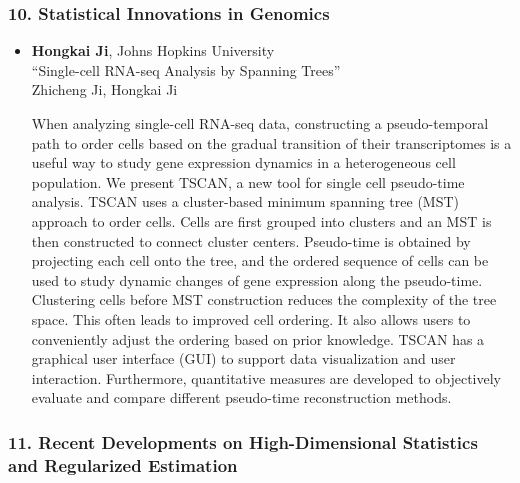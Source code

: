 \subsubsection*{10. Statistical Innovations in Genomics}

\begin{itemize}
\item \textbf{Hongkai Ji}, Johns Hopkins University \\
``Single-cell RNA-seq Analysis by Spanning Trees'' \\
Zhicheng Ji, Hongkai Ji


When analyzing single-cell RNA-seq data, constructing a pseudo-temporal path to order cells based on the gradual transition of their transcriptomes is a useful way to study gene expression dynamics in a heterogeneous cell population. We present TSCAN, a new tool for single cell pseudo-time analysis. TSCAN uses a cluster-based minimum spanning tree (MST) approach to order cells. Cells are first grouped into clusters and an MST is then constructed to connect cluster centers. Pseudo-time is obtained by projecting each cell onto the tree, and the ordered sequence of cells can be used to study dynamic changes of gene expression along the pseudo-time. Clustering cells before MST construction reduces the complexity of the tree space. This often leads to improved cell ordering. It also allows users to conveniently adjust the ordering based on prior knowledge. TSCAN has a graphical user interface (GUI) to support data visualization and user interaction. Furthermore, quantitative measures are developed to objectively evaluate and compare different pseudo-time reconstruction methods.

\end{itemize}

\subsubsection*{11. Recent Developments on High-Dimensional Statistics and Regularized Estimation}

